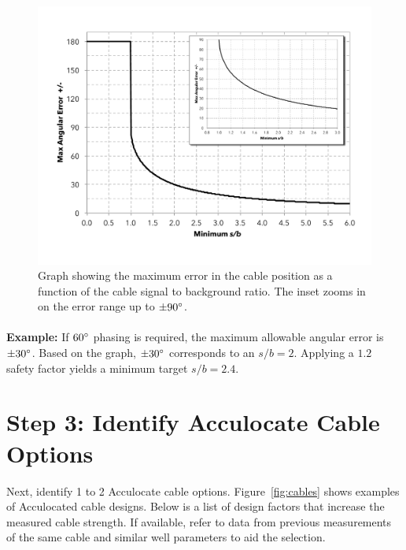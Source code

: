 \documentclass[paper=a4, fontsize=11pt]{scrartcl}
\numberwithin{equation}{section}		%
\numberwithin{figure}{section}			%
\numberwithin{table}{section}				%
\begin{document}
\begin{figure}[h!]
    \caption{Graph showing the maximum error in the cable position as a function of the cable signal to background ratio.  The inset zooms in on the error range up to $\pm90\degree$.}
    \label{fig:max_error_graph}
    \centering
    \includegraphics[width=1.0\textwidth]{figures/max_error_vs_sgbg.pdf}
\end{figure}

\paragraph{}
\textbf{Example:} If $60\degree$ phasing is required, the maximum allowable angular error is $\pm30\degree$.  Based on the graph, $\pm 30\degree$ corresponds to an $s/b=2$.  Applying a $1.2$ safety factor yields a minimum target $s/b = 2.4$.

\section{Step 3: Identify Acculocate Cable Options}\label{section:step_3}
Next, identify 1 to 2 Acculocate cable options.  Figure~\ref{fig:cables} shows examples of Acculocated cable designs.  Below is a list of design factors that increase the measured cable strength.  If available, refer to data from previous measurements of the same cable and similar well parameters to aid the selection. 
\end{document}
